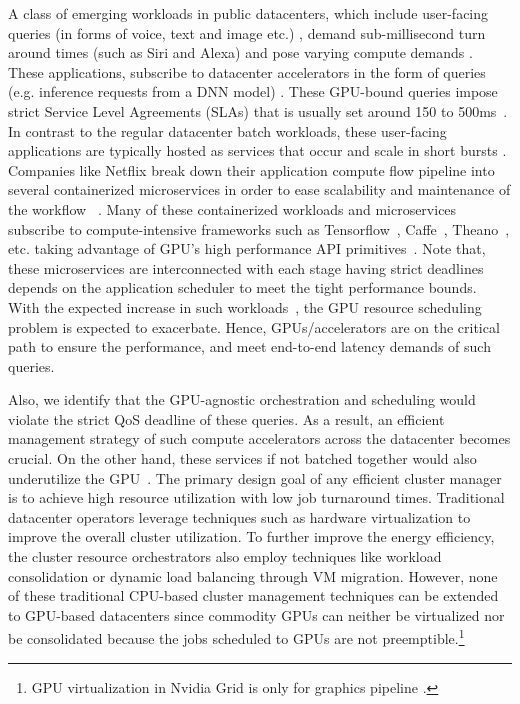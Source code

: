 A class of emerging workloads in public datacenters, which include user-facing queries (in forms of voice, text and image etc.)  \cite{qualcomm,TjongKimSang:2000:ICS:1117601.1117631,Hearst:2011:NSU:2018396.2018414}, demand sub-millisecond turn around times (such as Siri and Alexa) \cite{siri,alexa} and pose varying compute demands \cite{Hauswald:2015:SOE:2694344.2694347}. These applications, subscribe to datacenter accelerators in the form of queries (e.g. inference requests from a DNN model) \cite{hauswald2015djinn}. These GPU-bound queries impose strict Service Level Agreements (SLAs) that is usually set around 150 to 500ms~\cite{gujarati2017swayam}. In contrast to the regular datacenter batch workloads, these user-facing applications are typically hosted as services that occur and scale in short bursts \cite{Barroso:2009:DCI:1643608,Dean}. Companies like Netflix break down their application compute flow pipeline into several containerized microservices in order to ease scalability and maintenance of the workflow  ~\cite{netflix}. Many of these containerized workloads and microservices subscribe to compute-intensive frameworks such as Tensorflow~\cite{tensor}, Caffe~\cite{jia2014caffe}, Theano~\cite{Theano}, etc. taking advantage of GPU's high performance API primitives~\cite{ChetlurWVCTCS14}. Note that, these microservices are interconnected with each stage having strict deadlines depends on the application scheduler to meet the tight performance bounds. With the expected increase in such workloads~\cite{cisco}, the GPU resource scheduling problem is expected to exacerbate. Hence, GPUs/accelerators are on the critical path to ensure the performance, and meet end-to-end latency demands of such queries.

Also, we identify that the GPU-agnostic orchestration and scheduling would violate the strict QoS deadline of these queries. As a result, an efficient management strategy of such compute accelerators across the datacenter becomes crucial. 
On the other hand, these services if not batched together would also underutilize the GPU~\cite{hauswald2015djinn}. The primary design goal of any efficient cluster manager is to achieve high resource utilization with low job turnaround times. Traditional datacenter operators leverage techniques such as hardware virtualization \cite{Gupta:2011:PCS:2002181.2002184} to improve the overall cluster utilization. To further improve the energy efficiency, the cluster resource orchestrators also employ techniques like workload consolidation or dynamic load balancing through VM migration. However, none of these traditional CPU-based cluster management techniques can be extended to GPU-based datacenters since commodity GPUs can neither be virtualized nor be consolidated because the jobs scheduled to GPUs are not preemptible.\footnote{GPU virtualization in Nvidia Grid is only for graphics pipeline \cite{grid}.}

